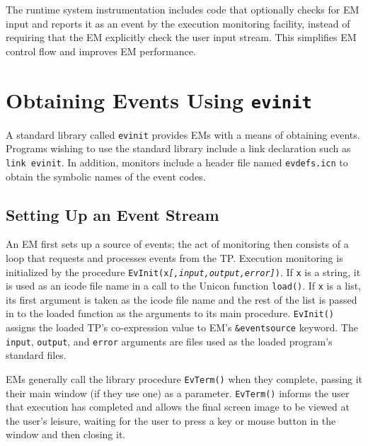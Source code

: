 \bigskip


The runtime system instrumentation includes code that optionally
checks for EM input and reports it as an event by the execution
monitoring facility, instead of requiring that the EM explicitly check
the user input stream.  This simplifies EM control 
flow and improves EM performance.

\section{Obtaining Events Using {\tt evinit}}

A standard library called {\tt evinit} provides EMs with
a means of obtaining events.  Programs wishing to use the
standard library include a link declaration such as {\tt link
evinit}.
In addition, monitors include a header file named {\tt evdefs.icn}
to obtain the symbolic names of the event codes.

\subsection*{Setting Up an Event Stream}

\vspace{0.25pc}
\noindent
An EM first sets up a source of events; the act of monitoring then
consists of a loop that requests and processes events from the TP.
Execution monitoring is initialized by the procedure
{\tt EvInit(x{\em [,input,output,error]\/})}.  If {\tt x} is a string, it is
used as an icode file name in a call to the Unicon function {\tt load()}.
If {\tt x} is a list, its first argument is taken as the icode file name
and the rest of the list is passed in to the loaded function as the
arguments to its main procedure.
{\tt EvInit()} assigns the loaded
TP's co-expression value to EM's {\tt \&eventsource} keyword.
The {\tt input}, {\tt output}, and {\tt error} arguments are files
used as the loaded program's standard files.

EMs generally call the library procedure {\tt EvTerm()} when they complete,
passing it their main window (if they use one) as a parameter.
{\tt EvTerm()} informs the user that execution has completed and allows the
final screen image to be viewed at the user's leisure, waiting for the user to
press a key or mouse button in the window and then closing it.

